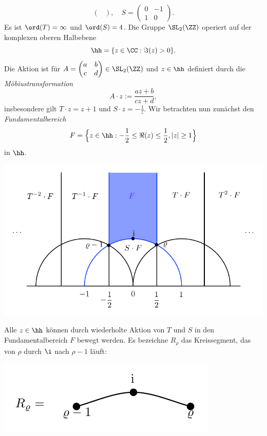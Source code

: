 \begin{enumerate}
\[\begin{pmatrix}
\end{pmatrix},\quad
S=\begin{pmatrix}
0 & -1 \\ 1 & 0
\end{pmatrix}.
\]
Es ist $\ord(T)=\infty$ und $\ord(S)=4$.
Die Gruppe $\SL_2(\ZZ)$ operiert auf der komplexen oberen Halbebene
\[
\hh = \{ z\in\CC : \Im(z) > 0 \}.
\]
Die Aktion ist für
$A=\begin{pmatrix} a&b \\ c&d \end{pmatrix}\in \SL_2(\ZZ)$
und $z\in \hh$ definiert durch die \emph{Möbiustransformation}
\[
A\cdot z := \frac{az+b}{cz+d},
\]
insbesondere gilt $T\cdot z= z+1$ und $S\cdot z=-\frac{1}{z}$.
Wir betrachten nun zunächst den \emph{Fundamentalbereich}
\[
F = \Bigl\{ z\in \hh : -\frac{1}{2}\leq \Re(z) \leq \frac{1}{2},
|z| \geq 1 \Bigr\}
\]
in $\hh$.
\begin{center}
	\includegraphics{grugraImages/fundbereich}
\end{center}
Alle $z\in \hh$ können durch wiederholte Aktion von $T$ und $S$
in den Fundamentalbereich $F$ bewegt werden.
Es bezeichne $R_{\rho}$ das Kreissegment, das von
$\rho$ durch $\i$ nach $\rho-1$ läuft:
\begin{center}
	\includegraphics{grugraImages/rho}
\end{center}

\end{enumerate}
